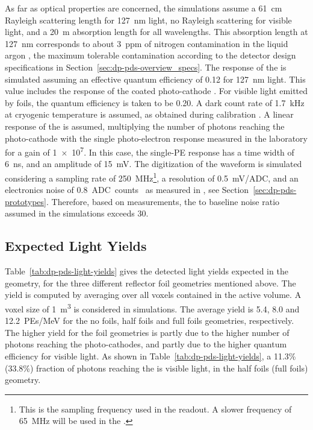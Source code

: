 As far as  optical properties are concerned, the simulations assume a \SI{61}{\cm} Rayleigh scattering length for \SI{127}{\nm} light, no Rayleigh scattering for visible light, and a \SI{20}{\m} absorption length for all wavelengths. This absorption length at \SI{127}{\nm} corresponds to about \SI{3}{ppm} of nitrogen contamination in the liquid argon \cite{Jones:2013bca}, the maximum tolerable contamination according to the detector design specifications in Section~\ref{sec:dp-pds-overview_specs}. The response of the  is simulated assuming an effective quantum efficiency of \num{0.12} for \SI{127}{\nm} light. This value includes the  response of the coated photo-cathode \cite{Bonesini:2018ubd}. For visible light emitted by  foils, the  quantum efficiency is taken to be \num{0.20}. A dark count rate of \SI{1.7}{\kilo\hertz} at cryogenic temperature is assumed, as obtained during   calibration \cite{Belver:2018erf}. A linear response of the  is assumed, multiplying the number of photons reaching the photo-cathode with the single photo-electron response measured in the laboratory for a gain of \num{1e7}. In this case, the single-PE response has a time width of \SI{6}{\nano\s}, and an amplitude of \SI{15}{mV}. The digitization of the waveform is simulated considering a sampling rate of \SI{250}{MHz}\footnote{This is the sampling frequency used in the  readout. A slower frequency of \SI{65}{MHz} will be used in the  .}, a resolution of \SI{0.5}{mV/ADC}, and an electronics noise of \SI{0.8}{ADC counts } as measured in , see Section~\ref{sec:dp-pds-prototypes}. Therefore, based on  measurements, the  to baseline noise  ratio assumed in the simulations exceeds \num{30}.


\subsection{Expected Light Yields}
\label{subsec:dp-pds-simulation_yields}

Table~\ref{tab:dp-pds-light-yields} gives the detected light yields expected in the \dune {} geometry, for the three different  reflector foil geometries mentioned above. The yield is computed by averaging over all \lar voxels contained in the  active volume. A voxel size of \SI{1}{\m^3} is considered in   simulations. The average yield is \num{5.4}, \num{8.0} and \SI{12.2}{PEs/MeV} for the no foils, half foils and full foils geometries, respectively. The higher yield for the foil geometries is partly due to the higher number of photons reaching the  photo-cathodes, and partly due to the higher  quantum efficiency for visible light. As shown in Table~\ref{tab:dp-pds-light-yields}, a 11.3\% (33.8\%) fraction of photons reaching the  is  visible light, in the half foils (full foils) geometry.


